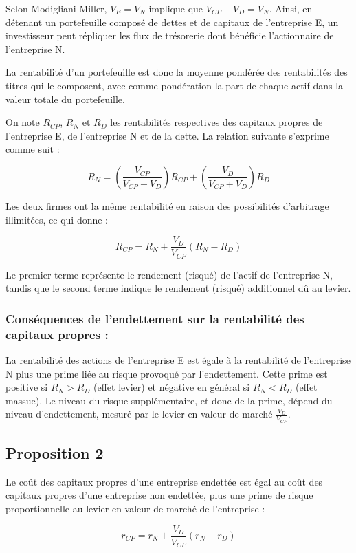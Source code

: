 \documentclass[a4paper, 12pt]{report}
\begin{document}
Selon Modigliani-Miller, \( V_E = V_N \) implique que \( V_{CP} + V_D = V_N \). Ainsi, en détenant un portefeuille composé de dettes et de capitaux de l'entreprise E, un investisseur peut répliquer les flux de trésorerie dont bénéficie l'actionnaire de l'entreprise N. 

La rentabilité d'un portefeuille est donc la moyenne pondérée des rentabilités des titres qui le composent, avec comme pondération la part de chaque actif dans la valeur totale du portefeuille.

On note \( R_{CP} \), \( R_N \) et \( R_D \) les rentabilités respectives des capitaux propres de l'entreprise E, de l'entreprise N et de la dette. La relation suivante s'exprime comme suit :

\[
R_N = \left( \frac{V_{CP}}{V_{CP} + V_D} \right) R_{CP} + \left( \frac{V_D}{V_{CP} + V_D} \right) R_D
\]

Les deux firmes ont la même rentabilité en raison des possibilités d'arbitrage illimitées, ce qui donne :

\[
R_{CP} = R_N + \frac{V_D}{V_{CP}} (R_N - R_D)
\]

Le premier terme représente le rendement (risqué) de l'actif de l'entreprise N, tandis que le second terme indique le rendement (risqué) additionnel dû au levier.

\subsubsection{Conséquences de l'endettement sur la rentabilité des capitaux propres :}
La rentabilité des actions de l'entreprise E est égale à la rentabilité de l'entreprise N plus une prime liée au risque provoqué par l'endettement. Cette prime est positive si \( R_N > R_D \) (effet levier) et négative en général si \( R_N < R_D \) (effet massue). Le niveau du risque supplémentaire, et donc de la prime, dépend du niveau d'endettement, mesuré par le levier en valeur de marché \( \frac{V_D}{V_{CP}} \).

\subsection{Proposition 2}

Le coût des capitaux propres d'une entreprise endettée est égal au coût des capitaux propres d'une entreprise non endettée, plus une prime de risque proportionnelle au levier en valeur de marché de l'entreprise :

\[
r_{CP} = r_N + \frac{V_D}{V_{CP}} (r_N - r_D)
\]
\end{document}
